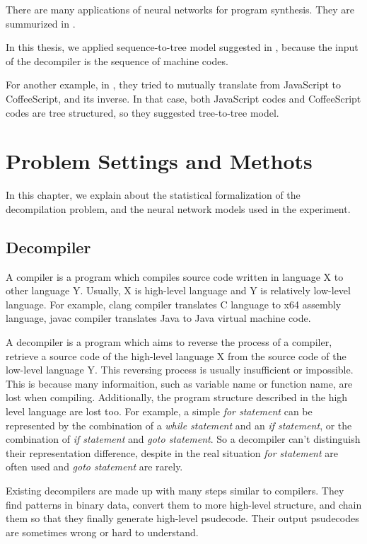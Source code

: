 \documentclass[senior,final,11pt]{iscs-thesis}
\begin{document}
There are many applications of neural networks for program synthesis. They are summurized in \cite{deep_programming_matome}.

In this thesis, we applied sequence-to-tree model suggested in \cite{Seq2Tree}, because the input of the decompiler is the sequence of machine codes.

For another example, in \cite{coffeescript_to_javascript}, they tried to mutually translate from JavaScript to CoffeeScript, and its inverse.
In that case, both JavaScript codes and CoffeeScript codes are tree structured, so they suggested tree-to-tree model.


\chapter{Problem Settings and Methots}

In this chapter, we explain about the statistical formalization of the decompilation problem,
and the neural network models used in the experiment.
\section{Decompiler}


A compiler is a program which compiles source code written in language X to other language Y. 
Usually, X is high-level language and Y is relatively low-level language. 
For example, clang compiler translates C language to x64 assembly language, javac compiler translates Java to Java virtual machine code.

A decompiler is a program which aims to reverse the process of a compiler, retrieve a source code of the high-level language X from the source code of the low-level language Y. 
This reversing process is usually insufficient or impossible.
This is because many informaition, such as variable name or function name, are lost when compiling.
Additionally, the program structure described in the high level language are lost too. 
For example, a simple {\sl for statement} can be represented by the combination of a {\sl while statement} and an {\sl if statement}, or the combination of {\sl if statement} and {\sl goto statement}. 
So a decompiler can't distinguish their representation difference, despite in the real situation {\sl for statement} are often used and {\sl goto statement} are rarely. 

Existing decompilers are made up with many steps similar to compilers. 
They find patterns in binary data, convert them to more high-level structure, and chain them so that they finally generate high-level psudecode.
Their output psudecodes are sometimes wrong or hard to understand.
\end{document}
